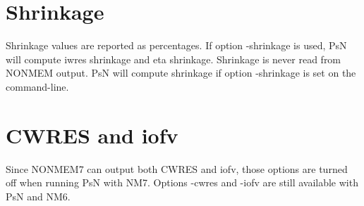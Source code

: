 \section{Shrinkage}

Shrinkage values are reported as percentages. If option -shrinkage is used, PsN will compute iwres shrinkage and eta shrinkage. 
Shrinkage is never read from NONMEM output. PsN will compute shrinkage if option -shrinkage is set on the command-line.

\section{CWRES and iofv}

Since NONMEM7 can output both CWRES and iofv, those options are turned off when running PsN with NM7. Options -cwres and -iofv are still available with PsN and NM6.


